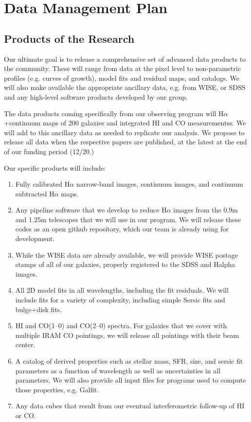 \documentclass[11pt,preprint]{aastex}
\begin{document}
\section*{Data Management Plan}

\subsection*{Products of the Research}

Our ultimate goal is to release a comprehensive set of advanced data products to the community.  These will range from data at the pixel level to non-parametric profiles (e.g. curves of growth), model fits and residual maps, and catalogs.  We will also make available the appropriate ancillary data, e.g. from WISE, or SDSS and any high-level software products developed by our group.

The data products coming specifically from our observing program will  H$\alpha$+continuum maps of 200 galaxies and integrated HI and CO measurementss.  We will add to this ancillary data as needed to replicate our analysis.  We propose to release all data when the respective papers are published, at the latest at the end of our funding period (12/20.)

Our specific products will include:

\begin{enumerate}

\item Fully calibrated H$\alpha$ narrow-band images, continuum images, and continuum subtracted H$\alpha$ maps.  

\item Any pipeline software that we develop to reduce H$\alpha$ images from the 0.9m and 1.25m telescopes that we will use in our program.  We will release these codes as an open github repository, which our team is already using for development.

\item While the WISE data are already available, we will provide WISE postage stamps of all of our galaxies, properly registered to the SDSS and Halpha images.  

\item All 2D model fits in all wavelengths, including the fit residuals.  We will include fits for a variety of complexity, including simple Sersic fits and bulge+disk fits.

\item HI and CO(1--0)  and CO(2--0) spectra. For galaxies that we cover with multiple IRAM CO pointings, we will release all pointings with their beam center.

\item A catalog of derived properties such as stellar mass, SFR, size, and sersic fit parameters as a function of wavelength as well as uncertainties in all parameters.  We will also provide all input files for programs used to compute those properties, e.g. Galfit.

\item Any data cubes that result from our eventual interferometric follow-up of HI or CO.

\end{enumerate}
\end{document}
